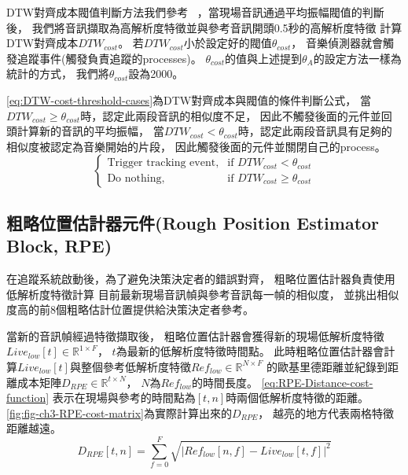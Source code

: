 \documentclass[class=NCU_thesis, crop=false]{standalone}
\begin{document}
DTW對齊成本閥值判斷方法我們參考~\cite{Lin2020AHumanComputerDuetSystem}
，當現場音訊通過平均振幅閥值的判斷後，
我們將音訊擷取為高解析度特徵並與參考音訊開頭0.5秒的高解析度特徵
計算DTW對齊成本${DTW_{cost}}$。
若${DTW_{cost}}$小於設定好的閥值$\theta _{cost}$，
音樂偵測器就會觸發追蹤事件(觸發負責追蹤的processes)。
$\theta _{cost}$的值與上述提到$\theta _{A}$的設定方法一樣為統計的方式，
我們將$\theta _{cost}$設為2000。

\cref{eq:DTW-cost-threshold-cases}為DTW對齊成本與閥值的條件判斷公式，
當$DTW_{cost} \geq \theta _{cost}$時，認定此兩段音訊的相似度不足，
因此不觸發後面的元件並回頭計算新的音訊的平均振幅，
當$DTW_{cost}  < \theta _{cost}$時，認定此兩段音訊具有足夠的相似度被認定為音樂開始的片段，
因此觸發後面的元件並關閉自己的process。
\begin{equation}
    \label{eq:DTW-cost-threshold-cases}
    \begin{cases}
        \text{Trigger tracking event}, & \text{if $DTW_{cost} < \theta _{cost}$} \\
        \text{Do nothing}, & \text{if $DTW_{cost} \geq \theta _{cost}$}
    \end{cases}
\end{equation}

\subsection{粗略位置估計器元件(Rough Position Estimator Block, RPE)} \label{ch3-subst-RPE}
在追蹤系統啟動後，為了避免決策決定者的錯誤對齊，
粗略位置估計器負責使用低解析度特徵計算
目前最新現場音訊幀與參考音訊每一幀的相似度，
並挑出相似度高的前8個粗略估計位置提供給決策決定者參考。

當新的音訊幀經過特徵擷取後，
粗略位置估計器會獲得新的現場低解析度特徵$Live_{low}[t] \in \mathbb{R}^{1 \times F}$，
$t$為最新的低解析度特徵時間點。
此時粗略位置估計器會計算$Live_{low}[t]$與整個參考低解析度特徵$Ref_{low} \in \mathbb{R}^{N \times F}$
的歐基里德距離並紀錄到距離成本矩陣$D_{RPE} \in \mathbb{R}^{t \times N}$，
$N$為$Ref_{low}$的時間長度。
\cref{eq:RPE-Distance-cost-function}
表示在現場與參考的時間點為$[t, n]$時兩個低解析度特徵的距離。
\cref{fig:fig-ch3-RPE-cost-matrix}為實際計算出來的$D_{RPE}$，
越亮的地方代表兩格特徵距離越遠。
\begin{equation}
    \label{eq:RPE-Distance-cost-function}
    D_{RPE}[t, n] = \sum_{f = 0}^{F}\sqrt{
    \left\lvert Ref_{low}[n, f]-Live_{low}[t, f]\right\rvert^{2}} 
\end{equation}
\end{document}
